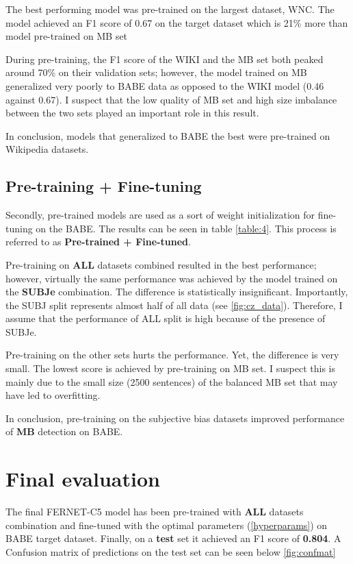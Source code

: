 The best performing model was pre-trained on the largest dataset, WNC. The model achieved an F1 score of 0.67 on the target dataset which is 21\% more than model
pre-trained on MB set

During pre-training, the F1 score of the WIKI and the MB set both peaked around 70\% on their validation sets; however, the model trained on MB generalized very poorly to BABE data as opposed to the WIKI model (0.46 against 0.67). I suspect that the low quality of MB set and high size imbalance between the two sets played an important role in this result.

In conclusion, models that generalized to BABE the best were pre-trained on Wikipedia datasets.

\subsection{Pre-training + Fine-tuning}
Secondly, pre-trained models are used as a sort of weight initialization for fine-tuning on the BABE. The results can be seen in table \ref{table:4}. This process is referred to as \textbf{Pre-trained + Fine-tuned}.

Pre-training on \textbf{ALL} datasets combined resulted in the best performance; however, virtually the same performance was achieved by the model trained on the \textbf{SUBJe} combination. The difference is statistically insignificant. Importantly, the SUBJ split represents almost half of all data (see \ref{fig:cz_data}). Therefore, I assume that the performance of ALL split is high because of the presence of SUBJe.

Pre-training on the other sets hurts the performance. Yet, the difference is very small. The lowest score is achieved by pre-training on MB set. I suspect this is mainly due to the small size (2500 sentences) of the balanced MB set that may have led to overfitting.

In conclusion, pre-training on the subjective bias datasets improved performance of \textbf{MB} detection on BABE.




\section{Final evaluation}
The final FERNET-C5 model has been pre-trained with \textbf{ALL} datasets combination and fine-tuned with the optimal parameters (\ref{hyperparams}) on BABE target dataset. Finally, on a \textbf{test} set it achieved an F1 score of \textbf{0.804}. A Confusion matrix of predictions on the test set can be seen below \ref{fig:confmat}

